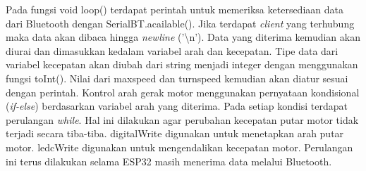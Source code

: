 Pada fungsi void loop() terdapat perintah untuk memeriksa ketersediaan data dari Bluetooth dengan SerialBT.acailable(). Jika terdapat \emph{client} yang terhubung maka data akan dibaca hingga \emph{newline} ('\textbackslash n'). Data yang diterima kemudian akan diurai dan dimasukkan kedalam variabel arah dan kecepatan. Tipe data dari variabel kecepatan akan diubah dari string menjadi integer dengan menggunakan fungsi toInt(). Nilai dari maxspeed dan turnspeed kemudian akan diatur sesuai dengan perintah. Kontrol arah gerak motor menggunakan pernyataan kondisional (\emph{if-else}) berdasarkan variabel arah yang diterima. Pada setiap kondisi terdapat perulangan \emph{while}. Hal ini dilakukan agar perubahan kecepatan putar motor tidak terjadi secara tiba-tiba. digitalWrite digunakan untuk menetapkan arah putar motor. ledcWrite digunakan untuk mengendalikan kecepatan motor. Perulangan ini terus dilakukan selama ESP32 masih menerima data melalui Bluetooth.

